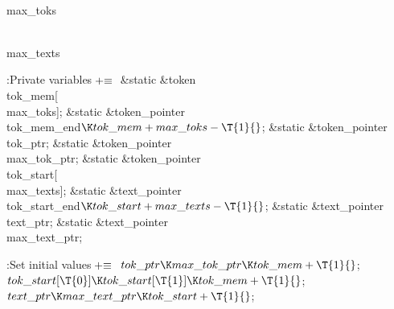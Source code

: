 \Y\B\4\D\\{max\_toks}\5
\par
\B\4\D\\{max\_texts}\5
\par
\Y\B\4:Private variables\X${}\mathrel+\equiv{}$\6
\&{static} \&{token} \\{tok\_mem}[\\{max\_toks}];\6
\&{static} \&{token\_pointer} \\{tok\_mem\_end}${}\K\\{tok\_mem}+\\{max\_toks}-%
\T{1}{}$;\6
\&{static} \&{token\_pointer} \\{tok\_ptr};\6
\&{static} \&{token\_pointer} \\{max\_tok\_ptr};\6
\&{static} \&{token\_pointer} \\{tok\_start}[\\{max\_texts}];\6
\&{static} \&{text\_pointer} \\{tok\_start\_end}${}\K\\{tok\_start}+\\{max%
\_texts}-\T{1}{}$;\6
\&{static} \&{text\_pointer} \\{text\_ptr};\6
\&{static} \&{text\_pointer} \\{max\_text\_ptr};\par
\fi

\B{}:Set initial values\X${}\mathrel+\equiv{}$\6
$\\{tok\_ptr}\K\\{max\_tok\_ptr}\K\\{tok\_mem}+\T{1}{}$;\6
${}\\{tok\_start}[\T{0}]\K\\{tok\_start}[\T{1}]\K\\{tok\_mem}+\T{1}{}$;\6
${}\\{text\_ptr}\K\\{max\_text\_ptr}\K\\{tok\_start}+\T{1}{}$;\par
\fi

